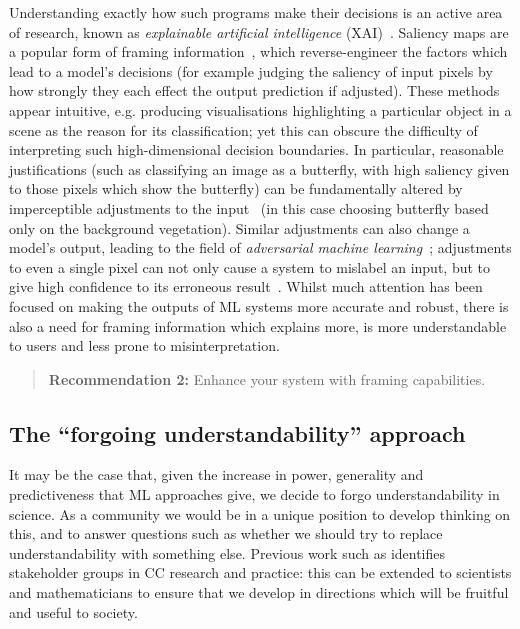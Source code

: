 \documentclass[letterpaper]{article}
\begin{document}
Understanding exactly how such programs make their decisions is an
active area of research, known as \emph{explainable artificial
  intelligence}
(XAI)~\cite{dovsilovic2018explainable,doshi2017towards,molnar2018interpretable}.
Saliency maps are a popular form of framing information~\cite{simonyan2013deep},
which reverse-engineer the factors which lead to a model's decisions (for
example judging the saliency of input pixels by how strongly they each effect
the output prediction if adjusted). These methods appear intuitive, e.g.
producing visualisations highlighting a particular object in a scene as the
reason for its classification; yet this can obscure the difficulty of
interpreting such high-dimensional decision boundaries. In particular,
reasonable justifications (such as classifying an image as a butterfly, with
high saliency given to those pixels which show the butterfly) can be
fundamentally altered by imperceptible adjustments to the
input~\cite{ghorbani2017interpretation} (in this case choosing butterfly based
only on the background vegetation). Similar adjustments can also change a
model's output, leading to the field of \emph{adversarial machine
  learning}~\cite{goodfellow2014explaining}; adjustments to even a single pixel
can not only cause a system to mislabel an input, but to give high confidence to
its erroneous result~\cite{su2019one}. Whilst much attention has been focused on
making the outputs of ML systems more accurate and robust, there is also a need
for framing information which explains more, is more understandable to users and
less prone to misinterpretation.

\begin{quote}
{\bf Recommendation 2:} Enhance your system with framing capabilities.

\end{quote}


\subsection{The ``forgoing understandability'' approach}
It may be the case that, given the increase in power, generality and
predictiveness that ML approaches give, we decide to forgo
understandability in science. As a community we would be in a unique
position to develop thinking on this, and to answer questions such as
whether we should try to replace understandability with something
else. Previous work such as \cite{colton:2015} identifies stakeholder
groups in CC research and practice: this can be extended to scientists
and mathematicians to ensure that we develop in directions which will
be fruitful and useful to society.
\end{document}

